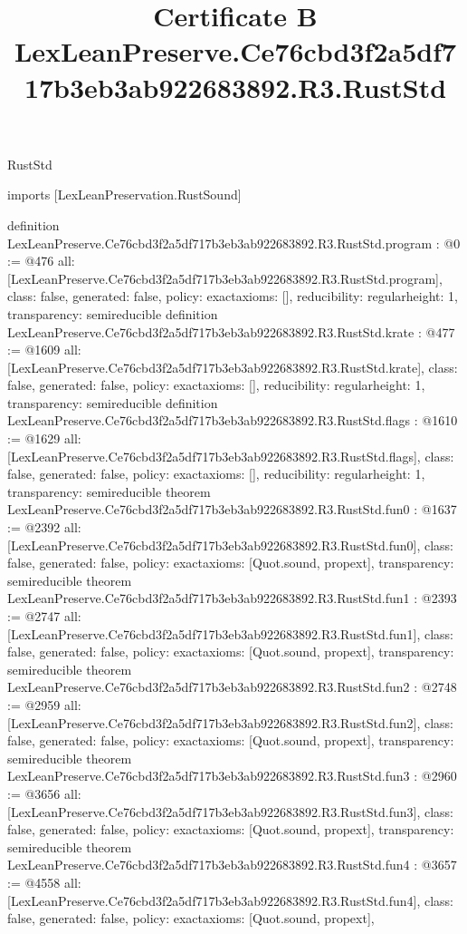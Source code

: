 \begin{lexlean}{RustStd}
\title{Certificate B LexLeanPreserve.Ce76cbd3f2a5df717b3eb3ab922683892.R3.RustStd}
\begin{coremodule}
imports [LexLeanPreservation.RustSound]

definition LexLeanPreserve.Ce76cbd3f2a5df717b3eb3ab922683892.R3.RustStd.program : @0 := @476 {
  all: [LexLeanPreserve.Ce76cbd3f2a5df717b3eb3ab922683892.R3.RustStd.program],
  class: false,
  generated: false,
  policy: exact{axioms: []},
  reducibility: regular{height: 1},
  transparency: semireducible
}
definition LexLeanPreserve.Ce76cbd3f2a5df717b3eb3ab922683892.R3.RustStd.krate : @477 := @1609 {
  all: [LexLeanPreserve.Ce76cbd3f2a5df717b3eb3ab922683892.R3.RustStd.krate],
  class: false,
  generated: false,
  policy: exact{axioms: []},
  reducibility: regular{height: 1},
  transparency: semireducible
}
definition LexLeanPreserve.Ce76cbd3f2a5df717b3eb3ab922683892.R3.RustStd.flags : @1610 := @1629 {
  all: [LexLeanPreserve.Ce76cbd3f2a5df717b3eb3ab922683892.R3.RustStd.flags],
  class: false,
  generated: false,
  policy: exact{axioms: []},
  reducibility: regular{height: 1},
  transparency: semireducible
}
theorem LexLeanPreserve.Ce76cbd3f2a5df717b3eb3ab922683892.R3.RustStd.fun0 : @1637 := @2392 {
  all: [LexLeanPreserve.Ce76cbd3f2a5df717b3eb3ab922683892.R3.RustStd.fun0],
  class: false,
  generated: false,
  policy: exact{axioms: [Quot.sound, propext]},
  transparency: semireducible
}
theorem LexLeanPreserve.Ce76cbd3f2a5df717b3eb3ab922683892.R3.RustStd.fun1 : @2393 := @2747 {
  all: [LexLeanPreserve.Ce76cbd3f2a5df717b3eb3ab922683892.R3.RustStd.fun1],
  class: false,
  generated: false,
  policy: exact{axioms: [Quot.sound, propext]},
  transparency: semireducible
}
theorem LexLeanPreserve.Ce76cbd3f2a5df717b3eb3ab922683892.R3.RustStd.fun2 : @2748 := @2959 {
  all: [LexLeanPreserve.Ce76cbd3f2a5df717b3eb3ab922683892.R3.RustStd.fun2],
  class: false,
  generated: false,
  policy: exact{axioms: [Quot.sound, propext]},
  transparency: semireducible
}
theorem LexLeanPreserve.Ce76cbd3f2a5df717b3eb3ab922683892.R3.RustStd.fun3 : @2960 := @3656 {
  all: [LexLeanPreserve.Ce76cbd3f2a5df717b3eb3ab922683892.R3.RustStd.fun3],
  class: false,
  generated: false,
  policy: exact{axioms: [Quot.sound, propext]},
  transparency: semireducible
}
theorem LexLeanPreserve.Ce76cbd3f2a5df717b3eb3ab922683892.R3.RustStd.fun4 : @3657 := @4558 {
  all: [LexLeanPreserve.Ce76cbd3f2a5df717b3eb3ab922683892.R3.RustStd.fun4],
  class: false,
  generated: false,
  policy: exact{axioms: [Quot.sound, propext]},
}
\end{coremodule}
\end{lexlean}
